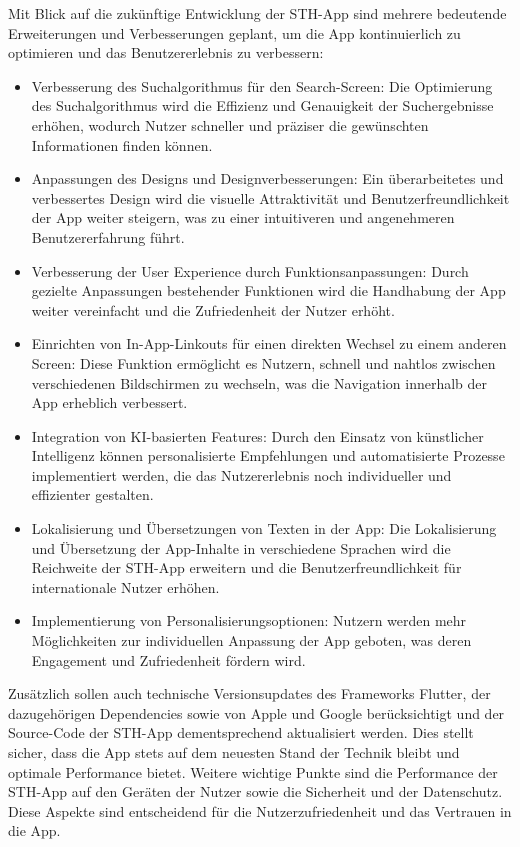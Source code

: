 Mit Blick auf die zukünftige Entwicklung der STH-App sind mehrere bedeutende Erweiterungen und Verbesserungen geplant, um die App kontinuierlich zu optimieren und das Benutzererlebnis zu verbessern:

\begin{itemize}
\item Verbesserung des Suchalgorithmus für den Search-Screen: Die Optimierung des Suchalgorithmus wird die Effizienz und Genauigkeit der Suchergebnisse erhöhen, wodurch Nutzer schneller und präziser die gewünschten Informationen finden können.
\item Anpassungen des Designs und Designverbesserungen: Ein überarbeitetes und verbessertes Design wird die visuelle Attraktivität und Benutzerfreundlichkeit der App weiter steigern, was zu einer intuitiveren und angenehmeren Benutzererfahrung führt.
\item Verbesserung der User Experience durch Funktionsanpassungen: Durch gezielte Anpassungen bestehender Funktionen wird die Handhabung der App weiter vereinfacht und die Zufriedenheit der Nutzer erhöht.
\item Einrichten von In-App-Linkouts für einen direkten Wechsel zu einem anderen Screen: Diese Funktion ermöglicht es Nutzern, schnell und nahtlos zwischen verschiedenen Bildschirmen zu wechseln, was die Navigation innerhalb der App erheblich verbessert.
\item Integration von KI-basierten Features: Durch den Einsatz von künstlicher Intelligenz können personalisierte Empfehlungen und automatisierte Prozesse implementiert werden, die das Nutzererlebnis noch individueller und effizienter gestalten.
\item Lokalisierung und Übersetzungen von Texten in der App: Die Lokalisierung und Übersetzung der App-Inhalte in verschiedene Sprachen wird die Reichweite der STH-App erweitern und die Benutzerfreundlichkeit für internationale Nutzer erhöhen.
\item Implementierung von Personalisierungsoptionen: Nutzern werden mehr Möglichkeiten zur individuellen Anpassung der App geboten, was deren Engagement und Zufriedenheit fördern wird.
\end{itemize}
Zusätzlich sollen auch technische Versionsupdates des Frameworks Flutter, der dazugehörigen Dependencies sowie von Apple und Google berücksichtigt und der Source-Code der STH-App dementsprechend aktualisiert werden. Dies stellt sicher, dass die App stets auf dem neuesten Stand der Technik bleibt und optimale Performance bietet.
Weitere wichtige Punkte sind die Performance der STH-App auf den Geräten der Nutzer sowie die Sicherheit und der Datenschutz. Diese Aspekte sind entscheidend für die Nutzerzufriedenheit und das Vertrauen in die App.

